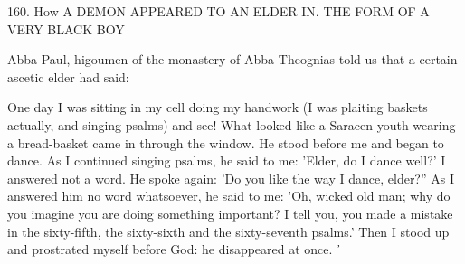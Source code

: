 160. How A DEMON APPEARED TO AN ELDER IN.
THE FORM OF A VERY BLACK BOY

Abba Paul, higoumen of the monastery of Abba Theognias told us
that a certain ascetic elder had said:

One day I was sitting in my cell doing my handwork (I was plaiting
baskets actually, and singing psalms) and see! What looked like a
Saracen youth wearing a bread-basket came in through the window.
He stood before me and began to dance. As I continued singing
psalms, he said to me: 'Elder, do I dance well?' I answered not a
word. He spoke again: 'Do you like the way I dance, elder?” As I
answered him no word whatsoever, he said to me: 'Oh, wicked old
man; why do you imagine you are doing something important? I tell
you, you made a mistake in the sixty-fifth, the sixty-sixth and the
sixty-seventh psalms.' Then I stood up and prostrated myself before
God: he disappeared at once. ᾿

